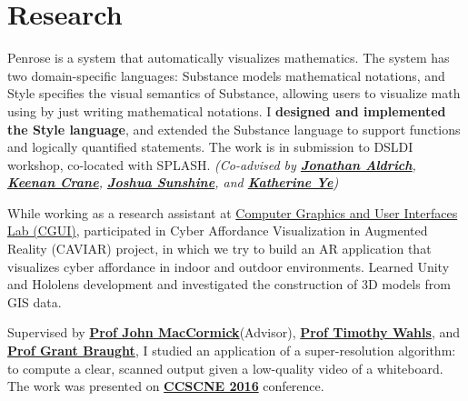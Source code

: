 \documentclass[]{deedy-resume-openfont}
\begin{document}
\begin{minipage}[t]{0.66\textwidth}



\section{Research}
Penrose is a system that automatically visualizes mathematics.  The system has two domain-specific languages: Substance models mathematical notations, and Style specifies the visual semantics of Substance, allowing users to visualize math using by just writing mathematical notations. I \textbf{designed and implemented the Style language}, and extended the Substance language to support functions and logically quantified statements. The work is in submission to DSLDI workshop, co-located with SPLASH. \textit{(Co-advised by \textbf{\href{https://www.cs.cmu.edu/~./aldrich/}{Jonathan Aldrich}}, \textbf{\href{https://www.cs.cmu.edu/~kmcrane/}{Keenan Crane}}, \textbf{\href{http://www.cs.cmu.edu/~jssunshi/}{Joshua Sunshine}}, and \textbf{\href{https://www.cs.cmu.edu/~kqy/}{Katherine Ye}})}

\sectionsep

While working as a research assistant at \href{http://graphics.cs.columbia.edu/kenny/home/home/}{Computer Graphics and User Interfaces Lab (CGUI)}, participated in Cyber Affordance Visualization in Augmented Reality (CAVIAR) project, in which we try to build an AR application that visualizes cyber affordance in indoor and outdoor environments. Learned Unity and Hololens development and investigated the construction of 3D models from GIS data.
\sectionsep

 Supervised by \textbf{\href{http://users.dickinson.edu/~jmac/}{Prof John MacCormick}}(Advisor), \textbf{\href{http://users.dickinson.edu/~wahlst/}{Prof Timothy Wahls}}, and \textbf{\href{http://users.dickinson.edu/~braught/?}{Prof Grant Braught}}, I studied an application of a super-resolution algorithm: to compute a clear, scanned output given a low-quality video of a whiteboard. The work was presented on \textbf{\href{http://ccscne.org/conferences/ccscne-2016/}{CCSCNE 2016}} conference.
\sectionsep



\end{minipage}
\end{document}
